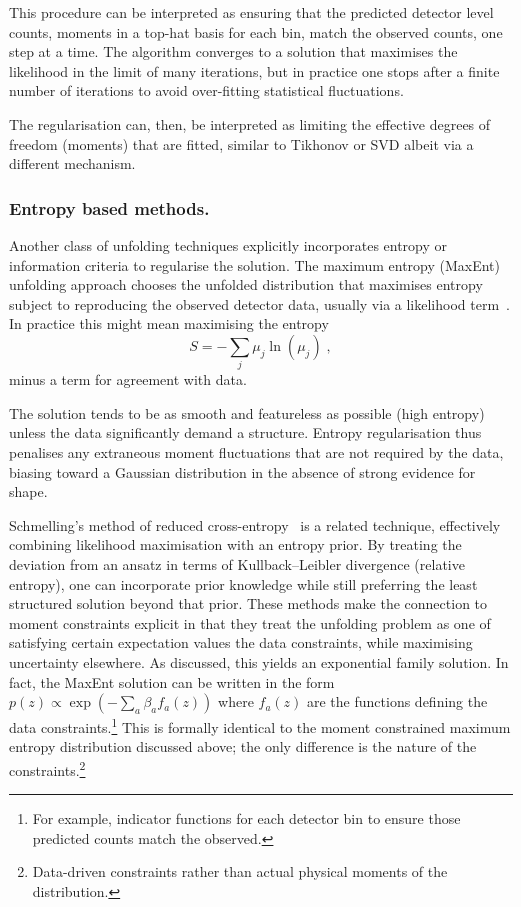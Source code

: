 {{            This procedure can be interpreted as ensuring that the predicted detector level counts, moments in a top-hat basis for each bin, match the observed counts, one step at a time.
            The algorithm converges to a solution that maximises the likelihood in the limit of many iterations, but in practice one stops after a finite number of iterations to avoid over-fitting statistical fluctuations.
            
            The regularisation can, then, be interpreted as limiting the effective degrees of freedom (moments) that are fitted, similar to Tikhonov or SVD albeit via a different mechanism.
        
        \subsubsection{Entropy based methods.}
            Another class of unfolding techniques explicitly incorporates entropy or information criteria to regularise the solution.
            The maximum entropy (MaxEnt) unfolding approach chooses the unfolded distribution that maximises entropy subject to reproducing the observed detector data, usually via a likelihood term~\cite{Narayan:1986wj}.
            In practice this might mean maximising the entropy
            \[
                S = -\sum_j \mu_j \ln(\mu_j)\;,
            \]
            minus a term for agreement with data.
            
            The solution tends to be as smooth and featureless as possible (high entropy) unless the data significantly demand a structure.
            Entropy regularisation thus penalises any extraneous moment fluctuations that are not required by the data, biasing toward a Gaussian distribution in the absence of strong evidence for shape.
            
            Schmelling's method of reduced cross-entropy~\cite{Schmelling:1993cd} is a related technique, effectively combining likelihood maximisation with an entropy prior.
            By treating the deviation from an ansatz in terms of Kullback--Leibler divergence (relative entropy), one can incorporate prior knowledge while still preferring the least structured solution beyond that prior.
            These methods make the connection to moment constraints explicit in that they treat the unfolding problem as one of satisfying certain expectation values the data constraints, while maximising uncertainty elsewhere.
            As discussed, this yields an exponential family solution.
            In fact, the MaxEnt solution can be written in the form $p(z) \propto \exp(-\sum_a \beta_a f_a(z))$ where $f_a(z)$ are the functions defining the data constraints.\footnote{For example, indicator functions for each detector bin to ensure those predicted counts match the observed.}
            This is formally identical to the moment constrained maximum entropy distribution discussed above; the only difference is the nature of the constraints.\footnote{Data-driven constraints rather than actual physical moments of the distribution.}
}}
